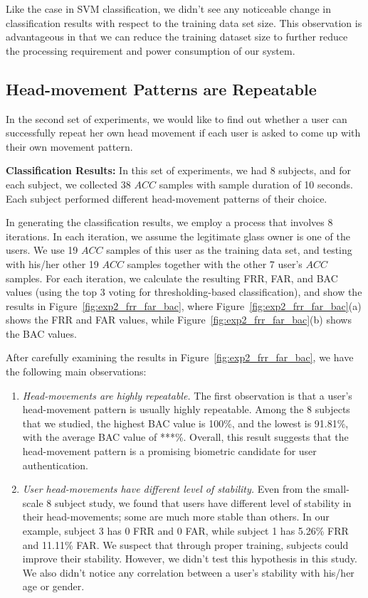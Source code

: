 Like the case in SVM classification, we didn't see any noticeable change in classification results with respect to the training data set size. This observation is advantageous in that we can reduce the training dataset size to further reduce the processing requirement and power consumption of our system.

\subsection{Head-movement Patterns are Repeatable}
In the second set of experiments, we would like to find out whether a user can successfully repeat her own head movement if each user is asked to come up with their own movement pattern.

\vspace{4pt}\textbf{Classification Results:} In this set of experiments, we had 8 subjects, and for each subject, we collected 38 $ACC$ samples with sample duration of 10 seconds. Each subject performed different head-movement patterns of their choice.

In generating the classification results, we employ a process that involves 8 iterations. In each iteration, we assume the legitimate glass owner is one of the users. We use 19 $ACC$ samples of this user as the training data set, and testing with his/her other 19 $ACC$ samples together with the other 7 user's $ACC$ samples. For each iteration, we calculate the resulting FRR, FAR, and BAC values (using the top 3 voting for thresholding-based classification), and show the results in Figure~\ref{fig:exp2_frr_far_bac}, where Figure~\ref{fig:exp2_frr_far_bac}(a) shows the FRR and FAR values, while Figure~\ref{fig:exp2_frr_far_bac}(b) shows the BAC values.

After carefully examining the results in Figure~\ref{fig:exp2_frr_far_bac}, we have the following main observations:
\begin{enumerate}
\item \emph{Head-movements are highly repeatable.} The first observation is that a user's head-movement pattern is usually highly repeatable. Among the 8 subjects that we studied, the highest BAC value is 100\%, and the lowest is 91.81\%, with the average BAC value of ***\%. Overall, this result suggests that the head-movement pattern is a promising biometric candidate for user authentication.

\item \emph{User head-movements have different level of stability.} Even from the small-scale 8 subject study, we found that users have different level of stability in their head-movements; some are much more stable than others. In our example, subject 3 has 0 FRR and 0 FAR, while subject 1 has 5.26\% FRR and 11.11\% FAR. We suspect that through proper training, subjects could improve their stability. However, we didn't test this hypothesis in this study. We also didn't notice any correlation between a user's stability with his/her age or gender.

\end{enumerate}

